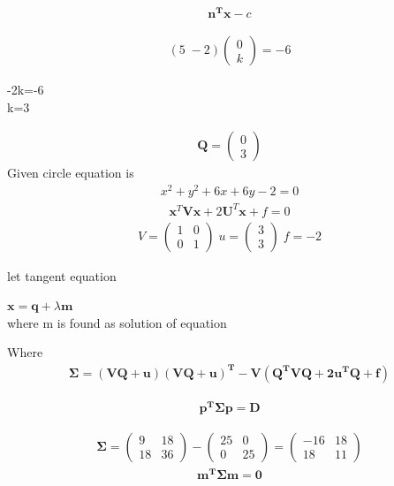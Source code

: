 \documentclass[journal,10pt,twocolumn]{article}
\let\vec\mathbf
\newcommand{\myvec}[1]{\ensuremath{\begin{pmatrix}#1\end{pmatrix}}}
\begin{document}
\begin{eqnarray}
\vec{n^Tx}-c
\end{eqnarray}

\begin{eqnarray}
{(5 \;-2)}
\myvec{0\\k}=-6
\end{eqnarray}

\begin{center}
-2k=-6\\
k=3
\end{center}

\begin{eqnarray}
\vec{Q}=\myvec{0\\3}
\end{eqnarray}
Given circle equation is \begin{align}
x^2+y^2+6x+6y-2=0
\end{align}
\begin{align}
\vec{x}^T\vec{Vx}+2\vec{U}^T\vec{x}+f=0
\end{align}
\begin{eqnarray}
V=\myvec{1&0\\ 0 &1} \; u=\myvec{3\\3} \;  f=-2
\end{eqnarray}





let tangent equation

$\vec{x}=\vec{q}+\lambda \vec{m}$\\
where m is found as solution of equation

Where  
\begin{eqnarray}
\vec{\Sigma=(VQ+u)(VQ+u)^T-V(Q^TVQ+2u^TQ+f)}
\end{eqnarray}

 \begin{eqnarray}
	 \vec{p^T\Sigma p}=\vec{D}
 \end{eqnarray}
 






\begin{eqnarray}
\vec{\Sigma}=\myvec{  9 &18\\ 18 &36  } -\myvec{  25 &0\\ 0 &25}
=\myvec{  -16 &18\\ 18 &11  }
\end{eqnarray}
\begin{eqnarray} 
\vec{m^T\Sigma m=0}                       
\end{eqnarray}
\end{document}
